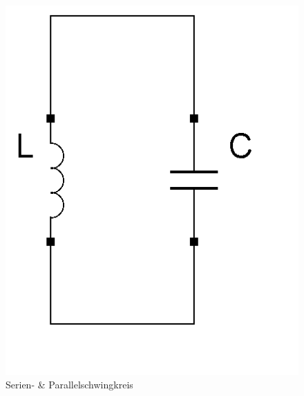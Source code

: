 \begin{frame}
\begin{center}
\begin{figure}
      \includegraphics[width=\textwidth,height=.75\textheight,keepaspectratio]{a04/Schwingkreis_parallel.png}
      \caption{Serien- \& Parallelschwingkreis}
    \end{figure}
  \end{center}
\end{frame}

